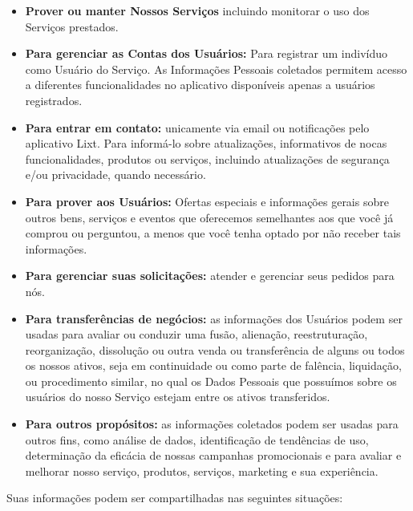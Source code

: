 \begin{itemize}
	\item \textbf{Prover ou manter Nossos Serviços} incluindo monitorar o uso dos Serviços prestados.
	\item \textbf{Para gerenciar as Contas dos Usuários:} Para registrar um indivíduo como Usuário do Serviço. As Informações Pessoais coletados permitem acesso a diferentes funcionalidades no aplicativo disponíveis apenas a usuários registrados.
	\item \textbf{Para entrar em contato:} unicamente via email ou notificações pelo aplicativo Lixt. Para informá-lo sobre atualizações, informativos de nocas funcionalidades, produtos ou serviços, incluindo atualizações de segurança e/ou privacidade, quando necessário.
	\item \textbf{Para prover aos Usuários:} Ofertas especiais e informações gerais sobre outros bens, serviços e eventos que oferecemos semelhantes aos que você já comprou ou perguntou, a menos que você tenha optado por não receber tais informações.
	\item \textbf{Para gerenciar suas solicitações:} atender e gerenciar seus pedidos para nós.
	\item \textbf{Para transferências de negócios:} as informações dos Usuários podem ser usadas para avaliar ou conduzir uma fusão, alienação, reestruturação, reorganização, dissolução ou outra venda ou transferência de alguns ou todos os nossos ativos, seja em continuidade ou como parte de falência, liquidação, ou procedimento similar, no qual os Dados Pessoais que possuímos sobre os usuários do nosso Serviço estejam entre os ativos transferidos.
	\item \textbf{Para outros propósitos:} as informações coletados podem ser usadas para outros fins, como análise de dados, identificação de tendências de uso, determinação da eficácia de nossas campanhas promocionais e para avaliar e melhorar nosso serviço, produtos, serviços, marketing e sua experiência. 
\end{itemize}

Suas informações podem ser compartilhadas nas seguintes situações:

